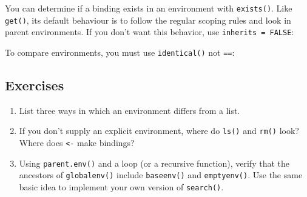 You can determine if a binding exists in an environment with
\texttt{exists()}. Like \texttt{get()}, its default behaviour is to
follow the regular scoping rules and look in parent environments. If you
don't want this behavior, use \texttt{inherits = FALSE}:

\begin{Shaded}
\begin{Highlighting}[]
\StringTok{ }
\NormalTok{(}\NormalTok{, } 
\NormalTok{(}\NormalTok{, }  \NormalTok{)}
\end{Highlighting}
\end{Shaded}

To compare environments, you must use \texttt{identical()} not
\texttt{==}:

\begin{Shaded}
\begin{Highlighting}[]
\NormalTok{(}\NormalTok{(), }\NormalTok{())}
\NormalTok{() ==}\StringTok{ }\NormalTok{()}
\end{Highlighting}
\end{Shaded}

\subsection{Exercises}

\begin{enumerate}
\def\labelenumi{\arabic{enumi}.}
\item
  List three ways in which an environment differs from a list.
\item
  If you don't supply an explicit environment, where do \texttt{ls()}
  and \texttt{rm()} look? Where does \texttt{\textless{}-} make
  bindings?
\item
  Using \texttt{parent.env()} and a loop (or a recursive function),
  verify that the ancestors of \texttt{globalenv()} include
  \texttt{baseenv()} and \texttt{emptyenv()}. Use the same basic idea to
  implement your own version of \texttt{search()}.
\end{enumerate}

